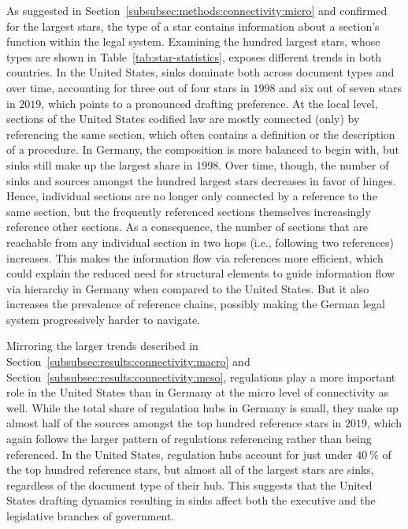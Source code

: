 \documentclass[utf8,sort&compress,table,hidelinks]{frontiersFPHY} %
\begin{document}
As suggested in Section~\ref{subsubsec:methods:connectivity:micro} and confirmed for the largest stars, the type of a star contains information about a section's function within the legal system.
Examining the hundred largest stars, whose types are shown in Table~\ref{tab:star-statistics}, exposes different trends in both countries.
In the United States, sinks dominate both across document types and over time, accounting for three out of four stars in $1998$ and six out of seven stars in $2019$, which points to a pronounced drafting preference.
At the local level, sections of the United States codified law are mostly connected (only) by referencing the same section, which often contains a definition or the description of a procedure.
In Germany, the composition is more balanced to begin with, but sinks still make up the largest share in $1998$. 
Over time, though, the number of sinks and sources amongst the hundred largest stars decreases in favor of hinges. 
Hence, individual sections are no longer only connected by a reference to the same section, but the frequently referenced sections themselves increasingly reference other sections.
As a consequence, the number of sections that are reachable from any individual section in two hops (i.e., following two references) increases.
This makes the information flow via references more efficient, which could explain the reduced need for structural elements to guide information flow via hierarchy in Germany when compared to the United States.
But it also increases the prevalence of reference chains, possibly making the German legal system progressively harder to navigate.



Mirroring the larger trends described in Section~\ref{subsubsec:results:connectivity:macro} and Section~\ref{subsubsec:results:connectivity:meso}, regulations play a more important role in the United States than in Germany at the micro level of connectivity as well. 
While the total share of regulation hubs in Germany is small, 
they make up almost half of the sources amongst the top hundred reference stars in $2019$, which again follows the larger pattern of regulations referencing rather than being referenced.
In the United States, regulation hubs account for just under $40~\%$ of the top hundred reference stars, 
but almost all of the largest stars are sinks, regardless of the document type of their hub.
This suggests that the United States drafting dynamics resulting in sinks affect both the executive and the legislative branches of government. 
\end{document}
